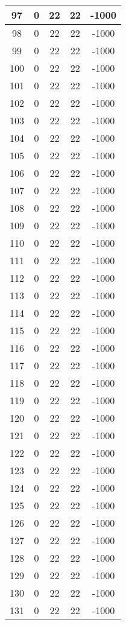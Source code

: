 \documentclass[letterpaper, 12pt]{article}
\begin{document}
\begin{longtable}{|c|c|c|c|c|}
\hline
97 & 0 & 22 & 22 & -1000 \\
\hline
98 & 0 & 22 & 22 & -1000 \\
\hline
99 & 0 & 22 & 22 & -1000 \\
\hline
100 & 0 & 22 & 22 & -1000 \\
\hline
101 & 0 & 22 & 22 & -1000 \\
\hline
102 & 0 & 22 & 22 & -1000 \\
\hline
103 & 0 & 22 & 22 & -1000 \\
\hline
104 & 0 & 22 & 22 & -1000 \\
\hline
105 & 0 & 22 & 22 & -1000 \\
\hline
106 & 0 & 22 & 22 & -1000 \\
\hline
107 & 0 & 22 & 22 & -1000 \\
\hline
108 & 0 & 22 & 22 & -1000 \\
\hline
109 & 0 & 22 & 22 & -1000 \\
\hline
110 & 0 & 22 & 22 & -1000 \\
\hline
111 & 0 & 22 & 22 & -1000 \\
\hline
112 & 0 & 22 & 22 & -1000 \\
\hline
113 & 0 & 22 & 22 & -1000 \\
\hline
114 & 0 & 22 & 22 & -1000 \\
\hline
115 & 0 & 22 & 22 & -1000 \\
\hline
116 & 0 & 22 & 22 & -1000 \\
\hline
117 & 0 & 22 & 22 & -1000 \\
\hline
118 & 0 & 22 & 22 & -1000 \\
\hline
119 & 0 & 22 & 22 & -1000 \\
\hline
120 & 0 & 22 & 22 & -1000 \\
\hline
121 & 0 & 22 & 22 & -1000 \\
\hline
122 & 0 & 22 & 22 & -1000 \\
\hline
123 & 0 & 22 & 22 & -1000 \\
\hline
124 & 0 & 22 & 22 & -1000 \\
\hline
125 & 0 & 22 & 22 & -1000 \\
\hline
126 & 0 & 22 & 22 & -1000 \\
\hline
127 & 0 & 22 & 22 & -1000 \\
\hline
128 & 0 & 22 & 22 & -1000 \\
\hline
129 & 0 & 22 & 22 & -1000 \\
\hline
130 & 0 & 22 & 22 & -1000 \\
\hline
131 & 0 & 22 & 22 & -1000 \\

\end{longtable}
\end{document}
